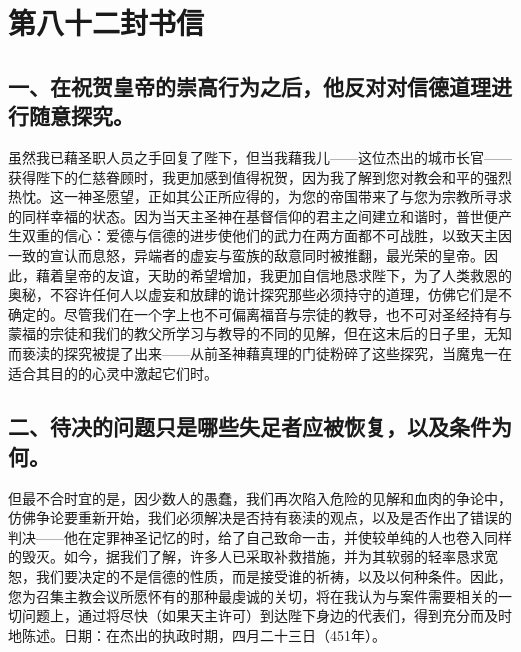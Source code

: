 

\section{第八十二封书信}

\par


\subsection{一、在祝贺皇帝的崇高行为之后，他反对对信德道理进行随意探究。}

虽然我已藉圣职人员之手回复了陛下，但当我藉我儿——这位杰出的城市长官——获得陛下的仁慈眷顾时，我更加感到值得祝贺，因为我了解到您对教会和平的强烈热忱。这一神圣愿望，正如其公正所应得的，为您的帝国带来了与您为宗教所寻求的同样幸福的状态。因为当天主圣神在基督信仰的君主之间建立和谐时，普世便产生双重的信心：爱德与信德的进步使他们的武力在两方面都不可战胜，以致天主因一致的宣认而息怒，异端者的虚妄与蛮族的敌意同时被推翻，最光荣的皇帝。因此，藉着皇帝的友谊，天助的希望增加，我更加自信地恳求陛下，为了人类救恩的奥秘，不容许任何人以虚妄和放肆的诡计探究那些必须持守的道理，仿佛它们是不确定的。尽管我们在一个字上也不可偏离福音与宗徒的教导，也不可对圣经持有与蒙福的宗徒和我们的教父所学习与教导的不同的见解，但在这末后的日子里，无知而亵渎的探究被提了出来——从前圣神藉真理的门徒粉碎了这些探究，当魔鬼一在适合其目的的心灵中激起它们时。\par


\subsection{二、待决的问题只是哪些失足者应被恢复，以及条件为何。}

但最不合时宜的是，因少数人的愚蠢，我们再次陷入危险的见解和血肉的争论中，仿佛争论要重新开始，我们必须解决是否持有亵渎的观点，以及是否作出了错误的判决——他在定罪神圣记忆的时，给了自己致命一击，并使较单纯的人也卷入同样的毁灭。如今，据我们了解，许多人已采取补救措施，并为其软弱的轻率恳求宽恕，我们要决定的不是信德的性质，而是接受谁的祈祷，以及以何种条件。因此，您为召集主教会议所愿怀有的那种最虔诚的关切，将在我认为与案件需要相关的一切问题上，通过将尽快（如果天主许可）到达陛下身边的代表们，得到充分而及时地陈述。日期：在杰出的执政时期，四月二十三日（451年）。\par

